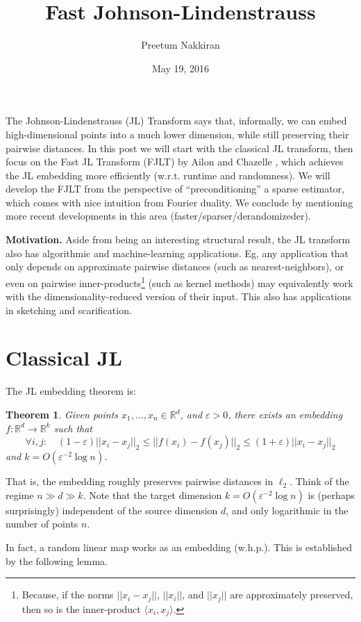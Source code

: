 \documentclass[]{article}
\title{Fast Johnson-Lindenstrauss}
\author{Preetum Nakkiran}
\date{May 19, 2016}
\newtheorem{theorem}{Theorem}
\newcommand{\1}{\mathbb{1}}
\newcommand{\R}{\mathbb{R}}
\renewcommand{\epsilon}{\varepsilon}
\newcommand{\innp}[1]{\langle #1 \rangle}
\begin{document}
\maketitle

The Johnson-Lindenstrauss (JL) Transform says that, informally,
we can embed high-dimensional points into a much lower dimension, while still
preserving their pairwise distances.
In this post we will start with the classical JL transform,
then focus on the Fast JL Transform (FJLT) by Ailon and Chazelle \cite{fjlt},
which achieves the JL embedding more
efficiently (w.r.t. runtime and randomness).
We will develop the FJLT from the perspective of ``preconditioning'' a sparse
estimator, which comes with nice intuition from Fourier duality.
We conclude by mentioning more recent developments in this area
(faster/sparser/derandomizeder).

{\bf Motivation.}
Aside from being an interesting structural result, the JL transform also has
algorithmic and machine-learning applications. Eg, any application that only
depends on approximate pairwise distances (such as nearest-neighbors), or even on pairwise
inner-products\footnote{Because, if the norms $||x_i-x_j||$, $||x_i||$, and $||x_j||$ are
    approximately preserved, then so is the inner-product $\innp{x_i,x_j}$.
}
(such as kernel methods) may equivalently work with the
dimensionality-reduced version of their input.
This also has applications in sketching and scarification.

\section{Classical JL}
The JL embedding theorem is:

\begin{theorem}
Given points $x_1, \dots, x_n \in \R^d$, and $\epsilon > 0$, there exists an embedding $f: \R^d \to
\R^k$ such that
$$\forall i, j: \quad
(1-\epsilon) ||x_i - x_j||_2
\leq
||f(x_i) - f(x_j)||_2
\leq
(1+\epsilon) ||x_i - x_j||_2
$$
and $k = O(\epsilon^{-2}\log n)$.
\end{theorem}
That is, the embedding roughly preserves pairwise distances in $\ell_2$.
Think of the regime $n \gg d \gg k$.
Note that the target dimension $k = O(\epsilon^{-2}\log n)$
is (perhaps surprisingly) independent of the source dimension $d$, and only
logarithmic in the number of points $n$.


In fact, a random linear map works as an embedding (w.h.p.).
This is established by the following lemma.
\end{document}

